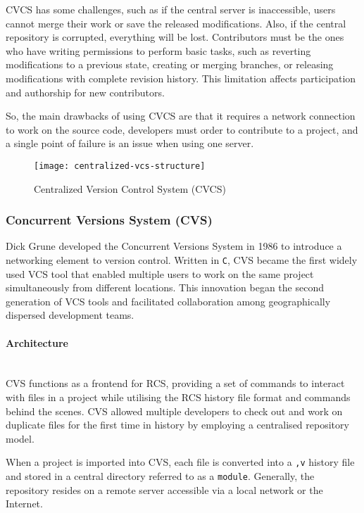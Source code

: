 CVCS has some challenges, such as if the central server is inaccessible, users cannot merge their work or save the released modifications. Also, if the central repository is corrupted, everything will be lost. Contributors must be the ones who have writing permissions to perform basic tasks, such as reverting modifications to a previous state, creating or merging branches, or releasing modifications with complete revision history. This limitation affects participation and authorship for new contributors.
\smallskip

So, the main drawbacks of using CVCS are that it requires a network connection to work on the source code, developers must order to contribute to a project, and a single point of failure is an issue when using one server.

\begin{figure}[H]
    \centering
    \texttt{[image: centralized-vcs-structure]}
    \caption{Centralized Version Control System (CVCS)}
    \label{fig:cvcs-structure}
\end{figure}

\subsubsection{Concurrent Versions System (CVS)}
\label{sec:cvs}
Dick Grune developed the Concurrent Versions System in 1986 to introduce a networking element to version control. Written in \lstinline{C}, CVS became the first widely used VCS tool that enabled multiple users to work on the same project simultaneously from different locations. This innovation began the second generation of VCS tools and facilitated collaboration among geographically dispersed development teams.
\paragraph{Architecture}
\hfill\medskip\\
CVS functions as a frontend for RCS, providing a set of commands to interact with files in a project while utilising the RCS history file format and commands behind the scenes. CVS allowed multiple developers to check out and work on duplicate files for the first time in history by employing a centralised repository model.
\smallskip

When a project is imported into CVS, each file is converted into a \lstinline{,v} history file and stored in a central directory referred to as a \lstinline{module}\cite{stopak_2019}. Generally, the repository resides on a remote server accessible via a local network or the Internet.
\smallskip

